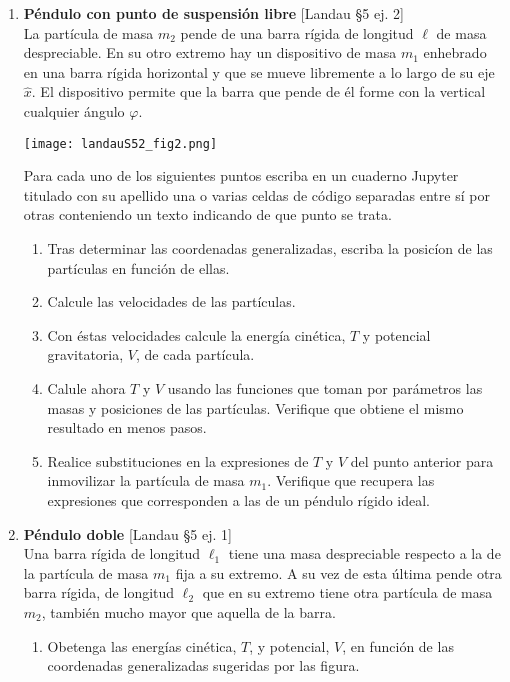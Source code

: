 \documentclass[11pt, spanish, a4paper, twoside]{article}
\begin{document}
\begin{enumerate}
\item
	\begin{minipage}[t][3cm]{0.7\textwidth}
		\textbf{Péndulo con punto de suspensión libre} [Landau \S5 ej. 2]\\
		La partícula de masa \(m_2\) pende de una barra rígida de longitud \(\ell\) de masa despreciable.
		En su otro extremo hay un dispositivo de masa \(m_1\) enhebrado en una barra rígida horizontal y que se mueve libremente a lo largo de su eje \(\hat{x}\).
		El dispositivo permite que la barra que pende de él forme con la vertical cualquier ángulo \(\varphi\). 
	\end{minipage}
	\begin{minipage}[c][2cm][t]{0.3\textwidth}
		\texttt{[image: landauS52\_fig2.png]}
	\end{minipage}
	Para cada uno de los siguientes puntos escriba en un cuaderno Jupyter titulado con su apellido una o varias celdas de código separadas entre sí por otras conteniendo un texto indicando de que punto se trata.
	\begin{enumerate}
		\item Tras determinar las coordenadas generalizadas, escriba la posicíon de las partículas en función de ellas.
		\item Calcule las velocidades de las partículas.
		\item Con éstas velocidades calcule la energía cinética, \(T\) y potencial gravitatoria, \(V\), de cada partícula.  
		\item Calule ahora \(T\) y \(V\) usando las funciones que toman por parámetros las masas y posiciones de las partículas. Verifique que obtiene el mismo resultado en menos pasos.
		\item Realice substituciones en la expresiones de \(T\) y \(V\) del punto anterior para inmovilizar la partícula de masa \(m_1\). Verifique que recupera las expresiones que corresponden a las de un péndulo rígido ideal.
	\end{enumerate}



\item
	\begin{minipage}[t][6cm]{0.7\textwidth}
		\textbf{Péndulo doble} [Landau \S5 ej. 1]\\
		Una barra rígida de longitud \(\ell_1\) tiene una masa despreciable respecto a la de la partícula de masa \(m_1\) fija a su extremo.
		A su vez de esta última pende otra barra rígida, de longitud \(\ell_2\) que en su extremo tiene otra partícula de masa \(m_2\), también mucho mayor que aquella de la barra.
		\begin{enumerate}
			\item Obetenga las energías cinética, \(T\), y potencial, \(V\), en función de las coordenadas generalizadas sugeridas por las figura.
			

\end{enumerate}
\end{minipage}
\end{enumerate}
\end{document}
